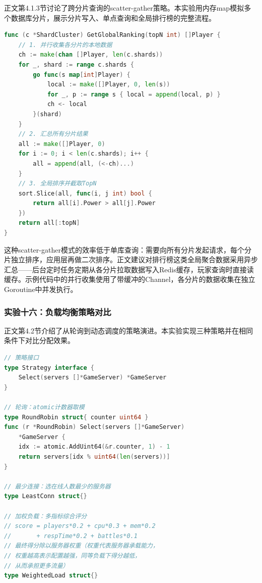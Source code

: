 正文第4.1.3节讨论了跨分片查询的scatter-gather策略。本实验用内存map模拟多个数据库分片，展示分片写入、单点查询和全局排行榜的完整流程。

\begin{tcolorbox}[title=scatter-gather全局排行榜]
\begin{lstlisting}[style=codeblock, language=go]
func (c *ShardCluster) GetGlobalRanking(topN int) []Player {
    // 1. 并行收集各分片的本地数据
    ch := make(chan []Player, len(c.shards))
    for _, shard := range c.shards {
        go func(s map[int]Player) {
            local := make([]Player, 0, len(s))
            for _, p := range s { local = append(local, p) }
            ch <- local
        }(shard)
    }
    // 2. 汇总所有分片结果
    all := make([]Player, 0)
    for i := 0; i < len(c.shards); i++ {
        all = append(all, (<-ch)...)
    }
    // 3. 全局排序并截取TopN
    sort.Slice(all, func(i, j int) bool {
        return all[i].Power > all[j].Power
    })
    return all[:topN]
}
\end{lstlisting}
\end{tcolorbox}

这种scatter-gather模式的效率低于单库查询：需要向所有分片发起请求，每个分片独立排序，应用层再做二次排序。正文建议对排行榜这类全局聚合数据采用异步汇总——后台定时任务定期从各分片拉取数据写入Redis缓存，玩家查询时直接读缓存。示例代码中的并行收集使用了带缓冲的Channel，各分片的数据收集在独立Goroutine中并发执行。

\subsubsection{实验十六：负载均衡策略对比}

正文第4.2节介绍了从轮询到动态调度的策略演进。本实验实现三种策略并在相同条件下对比分配效果。

\begin{tcolorbox}[title=三种负载均衡策略]
\begin{lstlisting}[style=codeblock, language=go]
// 策略接口
type Strategy interface {
    Select(servers []*GameServer) *GameServer
}

// 轮询：atomic计数器取模
type RoundRobin struct{ counter uint64 }
func (r *RoundRobin) Select(servers []*GameServer)
    *GameServer {
    idx := atomic.AddUint64(&r.counter, 1) - 1
    return servers[idx % uint64(len(servers))]
}

// 最少连接：选在线人数最少的服务器
type LeastConn struct{}

// 加权负载：多指标综合评分
// score = players*0.2 + cpu*0.3 + mem*0.2
//       + respTime*0.2 + battles*0.1
// 最终得分除以服务器权重（权重代表服务器承载能力，
// 权重越高表示配置越强，同等负载下得分越低，
// 从而承担更多流量）
type WeightedLoad struct{}
\end{lstlisting}
\end{tcolorbox}

